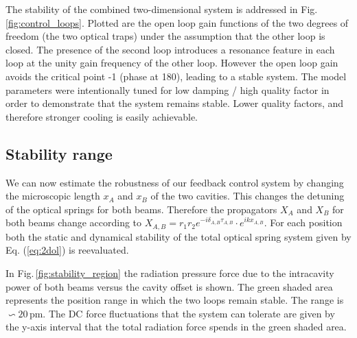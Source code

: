 The stability of the combined two-dimensional system is addressed in Fig.\,\ref{fig:control_loops}. Plotted are the open loop gain functions of the two degrees of freedom (the two optical traps) under the assumption that the other loop is closed. The presence of the second loop introduces a resonance feature in each loop at the unity gain frequency of the other loop. However the open loop gain avoids the critical point -1 (phase at 180), leading to a stable system. The model parameters were intentionally tuned for low damping / high quality factor in order to demonstrate that the system remains stable. Lower quality factors, and therefore stronger cooling is easily achievable.



\subsection{Stability range}
\label{sec:stability}
%
We can now estimate the robustness of our feedback control system 
by changing the microscopic length $x_A$ and $x_B$ of the two cavities. This changes the detuning of the optical springs for both beams. Therefore the propagators $X_A$ and $X_B$ for both beams change according to $X_{A,B}=r_1r_2 e^{-i\delta_{A,B}\tau_{A,B}}\cdot e^{ikx_{A,B}}$. For each position both the static and dynamical stability of the total optical spring system given by Eq. (\ref{eq:2dol}) is reevaluated.

In Fig.\,\ref{fig:stability_region} the radiation pressure force due to the intracavity power of both beams
versus the cavity offset is shown. The green shaded area represents the position range in which the two loops remain stable.  The range is $\backsim 20\,$pm. 
The DC force fluctuations that the system can tolerate are given by the y-axis interval that the total radiation force spends in the green shaded area. 

